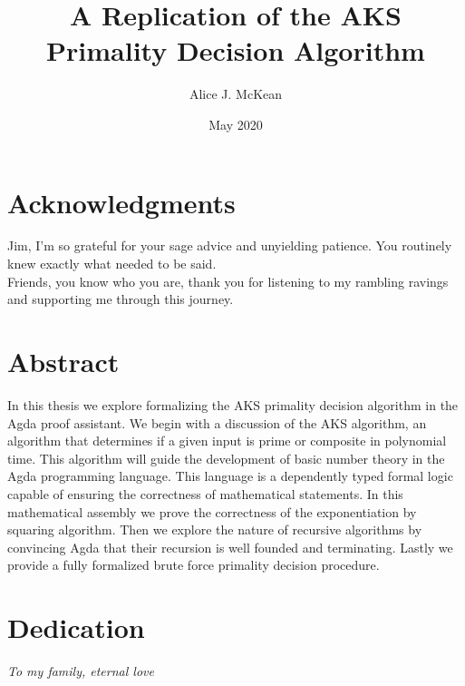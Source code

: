 \documentclass[12pt,twoside]{reedthesis}
\title{A Replication of the AKS Primality Decision Algorithm}
\author{Alice J. McKean}
\date{May 2020}
\newcommand{\Agda}[0]{Agda}
\begin{document}
\maketitle
\frontmatter
\pagestyle{empty}

\chapter*{Acknowledgments}
Jim, I'm so grateful for your sage advice and unyielding patience. You routinely
knew exactly what needed to be said. \\

Friends, you know who you are, thank you for listening to my rambling ravings
and supporting me through this journey.

\chapter*{Abstract}
In this thesis we explore formalizing the AKS primality decision algorithm in
the \Agda{} proof assistant. We begin with a discussion of the AKS algorithm, an
algorithm that determines if a given input is prime or composite in polynomial time.
This algorithm will guide the development of basic number theory in the \Agda{} programming
language. This language is a dependently typed formal logic capable of ensuring
the correctness of mathematical statements. In this mathematical assembly we
prove the correctness of the exponentiation by squaring algorithm. Then we
explore the nature of recursive algorithms by convincing \Agda{} that their
recursion is well founded and terminating. Lastly we provide a fully
formalized brute force primality decision procedure.

\chapter*{Dedication}
\textit{To my family, eternal love}

\tableofcontents

\mainmatter
\pagestyle{fancyplain}








\appendix

\backmatter

\nocite{gnu-parallel}


\end{document}
